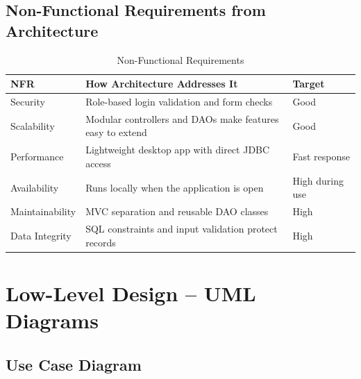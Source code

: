 \documentclass[12pt,a4paper]{report}
\newcommand{\rowO}{\rowcolor{LightGray!60}}
\begin{document}
\subsection{Non-Functional Requirements from Architecture}

\begin{table}[H]
\centering
\caption{Non-Functional Requirements}
\begin{tabularx}{\textwidth}{l X l}
\toprule
\rowcolor{PrimaryBlue!15}
\textbf{NFR} & \textbf{How Architecture Addresses It} & \textbf{Target} \\
\midrule
\rowO Security & Role-based login validation and form checks & Good \\
Scalability & Modular controllers and DAOs make features easy to extend & Good \\
\rowO Performance & Lightweight desktop app with direct JDBC access & Fast response \\
Availability & Runs locally when the application is open & High during use \\
\rowO Maintainability & MVC separation and reusable DAO classes & High \\
Data Integrity & SQL constraints and input validation protect records & High \\
\bottomrule
\end{tabularx}
\end{table}

\section{Low-Level Design -- UML Diagrams}

\subsection{Use Case Diagram}
\end{document}
